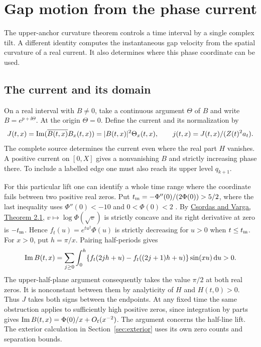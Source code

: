 \section{Gap motion from the phase current}\label{sec:current}
The upper-anchor curvature theorem controls a time interval by a single complex tilt. A different identity computes the instantaneous gap velocity from the spatial curvature of a real current. It also determines where this phase coordinate can be used.

\subsection{The current and its domain}
On a real interval with \(B\ne0\), take a continuous argument \(\Theta\) of \(B\) and write \(B=e^{p+\ii\Theta}\). At the origin \(\Theta=0\). Define the current and its normalization by
\begin{equation}
 J(t,x)=\operatorname{Im}(\overline{B(t,x)}B_x(t,x))=|B(t,x)|^2\Theta_x(t,x),
 \qquad j(t,x)=J(t,x)/(Z(t)^2a_t).
 \label{eq:current}
\end{equation}
The complete source determines the current even where the real part \(H\) vanishes. A positive current on \([0,X]\) gives a nonvanishing \(B\) and strictly increasing phase there. To include a labelled edge one must also reach its upper level \(q_{k+1}\).

For this particular lift one can identify a whole time range where the
coordinate fails between two positive real zeros. Put
\(t_{\rm m}=-\Phi''(0)/(2\Phi(0))>5/2\), where the last inequality
uses \(\Phi''(0)<-10\) and \(0<\Phi(0)<2\) \cite{EZPhaseScope}.
By \href{https://doi.org/10.1007/BF02075457}{Csordas and Varga, Theorem 2.1},
\(v\mapsto\log\Phi(\sqrt v)\) is strictly concave and its right derivative at
zero is \(-t_{\rm m}\). Hence \(f_t(u)=e^{tu^2}\Phi(u)\) is strictly
decreasing for \(u>0\) when \(t\le t_{\rm m}\). For \(x>0\), put \(h=\pi/x\).
Pairing half-periods gives
\[
 \operatorname{Im} B(t,x)=\sum_{j\ge0}\int_0^h
 \{f_t(2jh+u)-f_t((2j+1)h+u)\}\sin(xu)\,\mathrm d u>0 .
\]
The upper-half-plane argument consequently takes the value \(\pi/2\) at
both real zeros. It is nonconstant between them by analyticity of \(H\)
and \(H(t,0)>0\). Thus \(J\) takes both signs between the endpoints.
At any fixed time the same obstruction applies to sufficiently high positive
zeros, since integration by parts gives
\(\operatorname{Im} B(t,x)=\Phi(0)/x+O_t(x^{-2})\).
The argument concerns the half-line lift. The exterior calculation in
Section~\ref{sec:exterior} uses its own zero counts and separation bounds.

